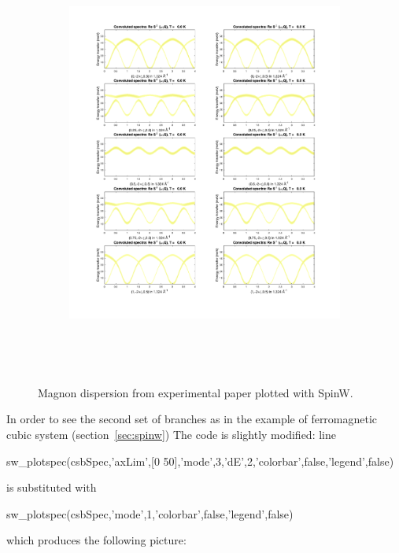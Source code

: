 \documentclass[a4paper,12pt]{article}
\begin{document}
            \begin{figure}[H]
                \centering
                \begin{subfigure}[b]{0.8\textwidth}
                    \centering
                    \includegraphics[height=14cm]{spinw-exp-before.png}
                \end{subfigure}
                \hfill
                \caption{Magnon dispersion from experimental paper plotted with SpinW.}
                \label{fig:spinw-exp-before}
            \end{figure}

            In order to see the second set of branches as in the example of ferromagnetic cubic system (section~\ref{sec:spinw}) The code is slightly modified:
            line
            \begin{python}
                sw_plotspec(csbSpec,'axLim',[0 50],'mode',3,'dE',2,'colorbar',false,'legend',false)
            \end{python}
            is substituted with
            \begin{python}
                sw_plotspec(csbSpec,'mode',1,'colorbar',false,'legend',false)
            \end{python}
            which produces the following picture:
\end{document}
